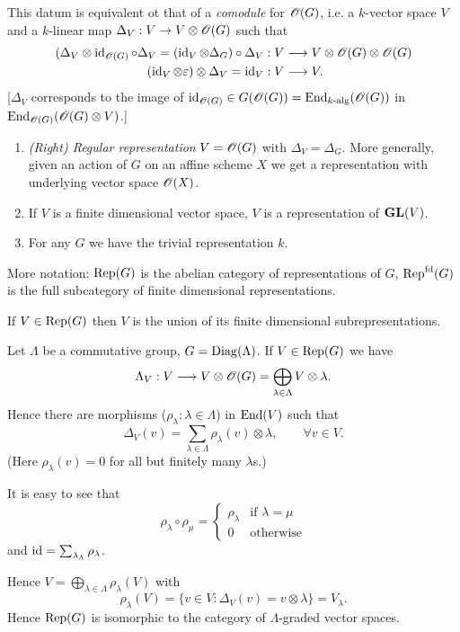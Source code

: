 This datum is equivalent ot that of a \emph{comodule} for $\mathscr{O}(G)$, i.e. a $k$-vector space $V$ and a $k$-linear map $\Delta_V:V\to V\otimes \OO(G)$ such that
\begin{align*}
	(\Delta_V\otimes\id_{\OO(G)}\circ \Delta_V = (\id_V\otimes \Delta_G)\circ \Delta_V &:V\to V\otimes\OO(G)\otimes\OO(G) \\
	(\id_V\otimes \eps)\otimes \Delta_V = \id_V &:V\to V.
\end{align*}
[$\Delta_V$ corresponds to the image of $\operatorname{id}_{\mathscr{O}(G)}\in G(\mathscr{O}(G))=\operatorname{End}_{k\text{-alg}}(\mathscr{O}(G))$ in $\operatorname{End}_{\mathscr{O}(G)}(\mathscr{O}(G)\otimes V)$.]
\begin{example}
	\begin{enumerate}[(1)]
		\item \emph{(Right) Regular representation} $V=\mathscr{O}(G)$ with $\Delta_V=\Delta_G$. More generally, given an action of $G$ on an affine scheme $X$ we get a representation with underlying vector space $\mathscr{O}(X)$.
		\item If $V$ is a finite dimensional vector space, $V$ is a representation of $\mathbf{GL}(V)$.
		\item For any $G$ we have the trivial representation $k$.
	\end{enumerate}
\end{example}
More notation: $\operatorname{Rep}(G)$ is the abelian category of representations of $G$, $\operatorname{Rep}^{\text{fd}}(G)$ is the full subcategory of finite dimensional representations.

If $V\in \operatorname{Rep}(G)$ then $V$ is the union of its finite dimensional subrepresentations.

\begin{example}
	Let $\Lambda$ be a commutative group, $G=\operatorname{Diag}(\Lambda)$. If $V\in \operatorname{Rep}(G)$ we have
	\[
	\Lambda_V:V\to V\otimes\OO(G) = \bigoplus_{\lambda\in \Lambda}V\otimes\lambda
	.\] 
	Hence there are morphisms ($\rho_\lambda:\lambda\in \Lambda$) in $\operatorname{End}(V)$ such that
	\[
	\Delta_V(v) = \sum_{\lambda\in \Lambda} \rho_\lambda(v)\otimes\lambda,\qquad \forall v\in V.
	\] 
	(Here $\rho_\lambda(v)=0$ for all but finitely many $\lambda$s.)

	It is easy to see that
	\[
	\rho_\lambda\circ\rho_\mu = \begin{cases}
		\rho_\lambda & \text{if }\lambda=\mu \\
		0 & \text{otherwise}
	\end{cases}
	\]
	and $\operatorname{id} = \sum_{\lambda_\Lambda}\rho_\lambda$.

	Hence $V=\bigoplus_{\lambda\in \Lambda}\rho_\lambda(V)$ with
	\[
	\rho_\lambda(V) = \{v\in V : \Delta_V(v) = v\otimes \lambda\} = V_\lambda
	.\] 
	Hence $\operatorname{Rep}(G)$ is isomorphic to the category of $\Lambda$-graded vector spaces.
\end{example}
